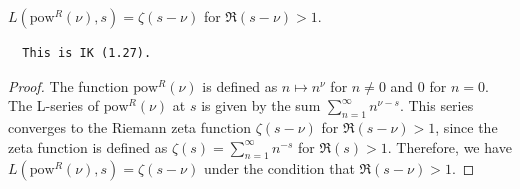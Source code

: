 \begin{theorem}
\label{LSeries_powR_eq}
\leanok
$L(\text{pow}^R(\nu), s) = \zeta(s - \nu)$ for $\Re(s - \nu) > 1$.
  \begin{verbatim}
  This is IK (1.27).
  \end{verbatim}
\end{theorem}
\begin{proof}
\leanok
The function $\text{pow}^R(\nu)$ is defined as $n \mapsto n^\nu$ for $n \neq 0$ and $0$ for $n = 0$. The L-series of $\text{pow}^R(\nu)$ at $s$ is given by the sum $\sum_{n=1}^{\infty} n^{\nu - s}$. This series converges to the Riemann zeta function $\zeta(s - \nu)$ for $\Re(s - \nu) > 1$, since the zeta function is defined as $\zeta(s) = \sum_{n=1}^{\infty} n^{-s}$ for $\Re(s) > 1$. Therefore, we have $L(\text{pow}^R(\nu), s) = \zeta(s - \nu)$ under the condition that $\Re(s - \nu) > 1$.
\end{proof}
